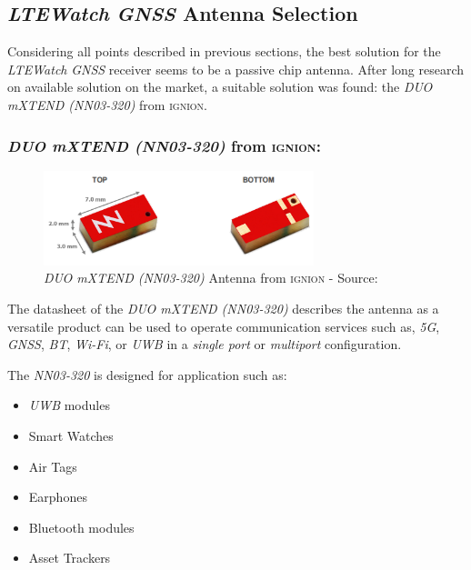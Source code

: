 \documentclass[report.tex]{subfiles}
\begin{document}
\pagebreak

\subsection{\textit{LTEWatch} \textit{GNSS} Antenna Selection}

Considering all points described in previous sections, the best solution for the \textit{LTEWatch} \textit{GNSS} receiver seems to be a passive chip antenna. After long research on available solution on the market, a suitable solution was found: the \textit{DUO mXTEND (NN03-320)} from \textsc{ignion}.

\subsubsection{\textit{DUO mXTEND (NN03-320)} from \textsc{ignion}:}

\begin{figure}[H]
	\centering
	\includegraphics[width=0.7\textwidth]{Include/Figure/antenna/gnss_antenna.png}
	\caption{\textit{DUO mXTEND (NN03-320)} Antenna from \textsc{ignion} - Source:\cite{GNSSANT}}
	\label{fig:gnss_antenna}
\end{figure}

The datasheet of the \textit{DUO mXTEND (NN03-320)}\cite{GNSSANT} describes the antenna as a versatile product can be used to operate communication services such as, \textit{5G}, \textit{GNSS}, \textit{BT}, \textit{Wi-Fi}, or \textit{UWB} in a \textit{single port }or \textit{multiport} configuration.\\

\begin{flushleft}
The \textit{NN03-320} is designed for application such as:
\end{flushleft}
\begin{itemize}
\item \textit{UWB} modules
\item Smart Watches
\item Air Tags
\item Earphones
\item Bluetooth modules
\item Asset Trackers
\end{itemize}
\end{document}
